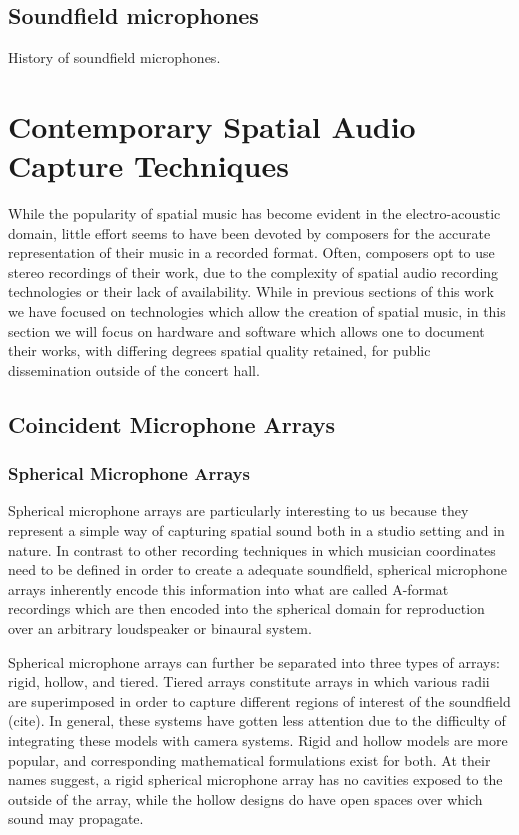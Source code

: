 \subsection{Soundfield microphones}

History of soundfield microphones.

\section{Contemporary Spatial Audio Capture Techniques} \label{sec:contemp_audio_capture}

While the popularity of spatial music has become evident in the electro-acoustic domain, little effort seems to have been devoted by composers for the accurate representation of their music in a recorded format. Often, composers opt to use stereo recordings of their work, due to the complexity of spatial audio recording technologies or their lack of availability. While in previous sections of this work we have focused on technologies which allow the creation of spatial music, in this section we will focus on hardware and software which allows one to document their works, with differing degrees spatial quality retained, for public dissemination outside of the concert hall. 

\subsection{Coincident Microphone Arrays}

\subsubsection{Spherical Microphone Arrays}

Spherical microphone arrays are particularly interesting to us because they represent a simple way of capturing spatial sound both in a studio setting and in nature. In contrast to other recording techniques in which musician coordinates need to be defined in order to create a adequate soundfield, spherical microphone arrays inherently encode this information into what are called A-format recordings which are then encoded into the spherical domain for reproduction over an arbitrary loudspeaker or binaural system. 

Spherical microphone arrays can further be separated into three types of arrays: rigid, hollow, and tiered. Tiered arrays constitute arrays in which various radii are superimposed in order to capture different regions of interest of the soundfield (cite). In general, these systems have gotten less attention due to the difficulty of integrating these models with camera systems. Rigid and hollow models are more popular, and corresponding mathematical formulations exist for both. At their names suggest, a rigid spherical microphone array has no cavities exposed to the outside of the array, while the hollow designs do have open spaces over which sound may propagate.

